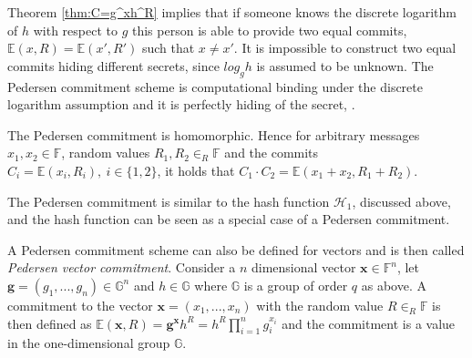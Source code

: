Theorem \ref{thm:C=g^xh^R} implies that if someone knows the discrete logarithm of $h$ with respect to $g$ this person is able to provide two equal commits, $\mathds{E}(x,R)=\mathds{E}(x',R')$ such that $x\neq x'$. It is impossible to construct two equal commits hiding different secrets, since $log_g h$ is assumed to be unknown. The Pedersen commitment scheme is computational binding under the discrete logarithm assumption and it is perfectly hiding of the secret, \cite{pedersen}. 

The Pedersen commitment is homomorphic. Hence for arbitrary messages $x_1,x_2\in\mathds{F}$, random values $R_1,R_2\in_R\mathds{F}$ and the commits $C_i=\mathds{E}(x_i,R_i),\:i\in\{1,2\}$, it holds that $C_1\cdot C_2 = \mathds{E}(x_1+x_2,R_1+R_2)$.

The Pedersen commitment is similar to the hash function $\mathcal{H}_1$, discussed above, and the hash function can be seen as a  special case of a Pedersen commitment.

A Pedersen commitment scheme can also be defined for vectors and is then called \textit{Pedersen vector commitment}. Consider a $n$ dimensional vector $\mathbf{x}\in\mathds{F}^n$, let $\mathbf{g}=(g_1,...,g_n) \in\mathds{G}^n$ and $h\in\mathds{G}$ where $\mathds{G}$ is a group of order $q$ as above. A commitment to the vector  $\mathbf{x}=(x_1,...,x_n)$  with the random value $R\in_R \mathds{F}$ is then defined as $\mathds{E}(\mathbf{x},R) = \mathbf{g}^\mathbf{x}h^R = h^R\prod_{i=1}^n g_i^{x_i}$ and the commitment is a value in the one-dimensional group $\mathds{G}$. 

